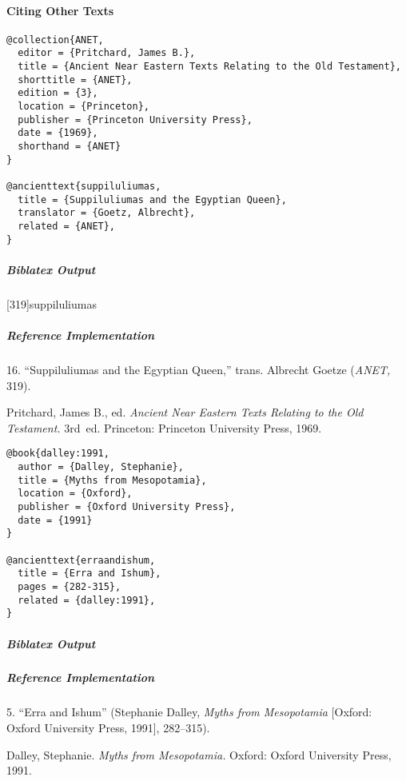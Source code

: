 \documentclass[a4paper]{article}
\newenvironment{biboutput}{%
  \subparagraph{Biblatex Output}
}{\color{black}}
\newenvironment{refimp}{%
  \subparagraph{Reference Implementation}
  \color{reference-colour}
  \rm
}{\par\color{black}}
\begin{document}
\paragraph{Citing Other Texts}

\begin{lstlisting}
@collection{ANET,
  editor = {Pritchard, James B.},
  title = {Ancient Near Eastern Texts Relating to the Old Testament},
  shorttitle = {ANET},
  edition = {3},
  location = {Princeton},
  publisher = {Princeton University Press},
  date = {1969},
  shorthand = {ANET}
}

@ancienttext{suppiluliumas,
  title = {Suppiluliumas and the Egyptian Queen},
  translator = {Goetz, Albrecht},
  related = {ANET},
}
\end{lstlisting}

\begin{biboutput}
  [319]{suppiluliumas}
\end{biboutput}

\begin{refimp}
  \hspace*{\bibindent}16. “Suppiluliumas and the Egyptian Queen,” trans.\@
  Albrecht Goetze (\emph{ANET,} 319).

  \hangindent\bibindent Pritchard, James B., ed. \emph{Ancient Near Eastern
  Texts Relating to the Old Testament.} 3rd~ed. Princeton: Princeton
  University Press, 1969.

\end{refimp}

\medskip

\begin{lstlisting}
@book{dalley:1991,
  author = {Dalley, Stephanie},
  title = {Myths from Mesopotamia},
  location = {Oxford},
  publisher = {Oxford University Press},
  date = {1991}
}

@ancienttext{erraandishum,
  title = {Erra and Ishum},
  pages = {282-315},
  related = {dalley:1991},
}
\end{lstlisting}

\begin{biboutput}
\end{biboutput}

\begin{refimp}
  \hspace*{\bibindent}5. “Erra and Ishum” (Stephanie Dalley, \emph{Myths from
  Mesopotamia} [Oxford: Oxford University Press, 1991], 282–315).
  
  \hangindent\bibindent Dalley, Stephanie. \emph{Myths from Mesopotamia.}
  Oxford: Oxford University Press, 1991.
\end{refimp}
\end{document}
